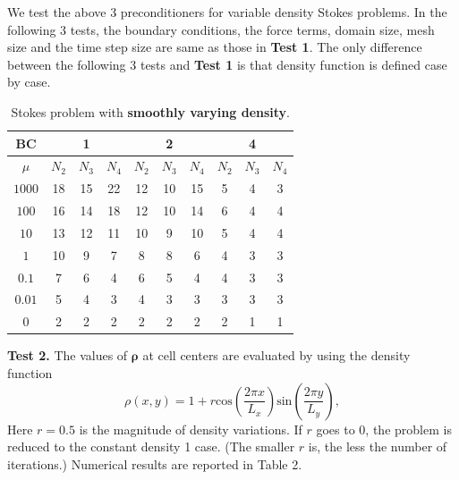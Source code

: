 \documentclass[9pt]{article}
\newcommand{\V}[1]{\boldsymbol{#1}}
\begin{document}
We test the above 3 preconditioners for variable density Stokes problems. In the following 3 tests, the boundary conditions, the force terms, domain size, mesh size and the time step size are same as those in {\bf Test 1}. The only difference between the following 3 tests and {\bf Test 1} is that density function is defined case by case.

\begin{table}[h]
\begin{center}
\begin{tabular}{|c||ccc|ccc|ccc|}
\hline
BC     &    &1    &  &   & 2    &  &   &4     & \\
\hline
$\mu $   &$N_2$ &$N_3$  &$N_4$  &$N_2$ &$N_3$  &$N_4$    &$N_2$  &$N_3$  &$N_4$ \\
\hline
\hline
$1000$    &18   &15  &22     &12  &10  &15      &5   &4  &3 \\
\hline
$100$     &16   &14  &18     &12  &10  &14      &6   &4  &4 \\
\hline
$10$      &13   &12  &11     &10  &9   &10      &5   &4  &4 \\
\hline
$1$       &10   &9   &7      &8  &8    &6      &4   &3  &3 \\
\hline
$0.1$     &7   &6   &4       &6   &5  &4       &4   &3   &3 \\
\hline
$0.01$    &5   &4   &3       &4   &3  &3      &3   &3   &3 \\
\hline
$0$       &2   &2   &2       &2   &2  &2      &2   &1   &1 \\
\hline
\end{tabular}
\vspace{2mm} \caption{Stokes problem with {\bf smoothly varying density}.
}
\end{center}
\end{table}

{\bf Test 2.} The values of $\V{\rho}$ at cell centers are evaluated by using the density function
$$
\rho(x, y) = 1+  r \mbox{cos}\left(\frac{2 \pi x}{L_x}\right)\mbox{sin} \left(\frac{2 \pi y}{L_y}\right),
$$
Here $r=0.5$ is the magnitude of density variations.  If $r$ goes to 0, the problem is reduced to the constant density 1 case. (The smaller $r$ is, the less the number of iterations.) Numerical results are reported in Table 2.
\end{document}
